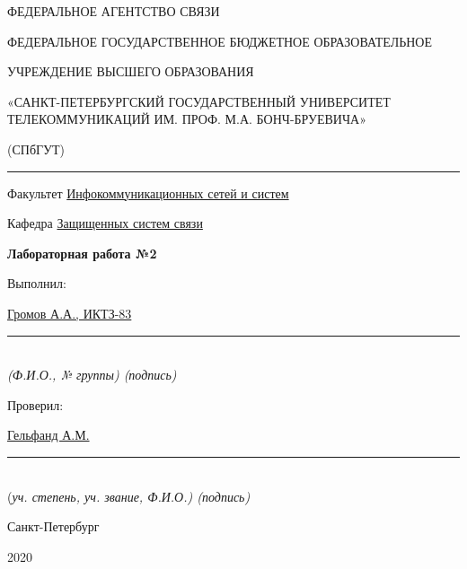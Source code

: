 \documentclass[a4paper,14pt]{extarticle}
\begin{document}
    \begin{center}
        \thispagestyle{empty}
        \begin{singlespace}
        ФЕДЕРАЛЬНОЕ АГЕНТСТВО СВЯЗИ

        ФЕДЕРАЛЬНОЕ ГОСУДАРСТВЕННОЕ БЮДЖЕТНОЕ ОБРАЗОВАТЕЛЬНОЕ

        УЧРЕЖДЕНИЕ ВЫСШЕГО ОБРАЗОВАНИЯ

        «САНКТ-ПЕТЕРБУРГСКИЙ ГОСУДАРСТВЕННЫЙ УНИВЕРСИТЕТ ТЕЛЕКОММУНИКАЦИЙ ИМ. ПРОФ. М.А. БОНЧ-БРУЕВИЧА»

        (СПбГУТ)
        \end{singlespace}
        \vspace{-1ex}
        \rule{\textwidth}{0.4pt}
        \vspace{-5ex}

        Факультет \underline{Инфокоммуникационных сетей и систем}

        Кафедра \underline{Защищенных систем связи}
        \vspace{10ex}

        \textbf{Лабораторная работа №2}

    \end{center}
    \vspace{4ex}
    \begin{flushright}
    \parbox{8cm}{
    \begin{flushleft}
        Выполнил:

        \underline{Громов А.А., ИКТЗ-83} \hfill \rule[-0.85ex]{0.1\textwidth}{0.6pt}\\
        \vspace{-1ex}
        \footnotesize \textit{ (Ф.И.О., № группы) \hfill (подпись)} \normalsize

        Проверил:

        \underline{Гельфанд А.М.} \hfill \rule[-0.85ex]{0.1\textwidth}{0.6pt}\\
        \vspace{-1ex}
        (\footnotesize \textit{уч. степень, уч. звание, Ф.И.О.) \hfill (подпись)} \normalsize

    \end{flushleft}
    }
    \end{flushright}
    \begin{center}
        \vfill
        Санкт-Петербург

        2020

        \end{center}
\end{document}
